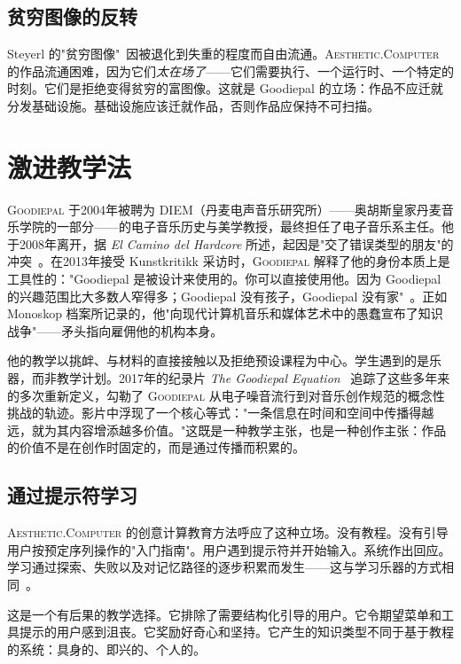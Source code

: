 \documentclass[10pt,letterpaper,twocolumn]{article}
\newcommand{\ac}{\textsc{Aesthetic.Computer}}
\newcommand{\gp}{\textsc{Goodiepal}}
\begin{document}
\subsection{贫穷图像的反转}

Steyerl 的"贫穷图像"~\citep{steyerl2009defense}因被退化到失重的程度而自由流通。\ac{} 的作品流通困难，因为它们\emph{太在场了}——它们需要执行、一个运行时、一个特定的时刻。它们是拒绝变得贫穷的富图像。这就是 Goodiepal 的立场：作品不应迁就分发基础设施。基础设施应该迁就作品，否则作品应保持不可扫描。

\section{激进教学法}

\gp{} 于2004年被聘为 DIEM（丹麦电声音乐研究所）——奥胡斯皇家丹麦音乐学院的一部分——的电子音乐历史与美学教授，最终担任了电子音乐系主任。他于2008年离开，据 \emph{El Camino del Hardcore} 所述，起因是"交了错误类型的朋友"的冲突~\citep{goodiepal2012elcamino}。在2013年接受 Kunstkritikk 采访时，\gp{} 解释了他的身份本质上是工具性的："Goodiepal 是被设计来使用的。你可以直接使用他。因为 Goodiepal 的兴趣范围比大多数人窄得多；Goodiepal 没有孩子，Goodiepal 没有家"~\citep{kunstkritikk2013goodiepal}。正如 Monoskop 档案所记录的，他"向现代计算机音乐和媒体艺术中的愚蠢宣布了知识战争"——矛头指向雇佣他的机构本身。

他的教学以挑衅、与材料的直接接触以及拒绝预设课程为中心。学生遇到的是乐器，而非教学计划。2017年的纪录片 \emph{The Goodiepal Equation}~\citep{sanpakkila2017equation} 追踪了这些多年来的多次重新定义，勾勒了 \gp{} 从电子噪音流行到对音乐创作规范的概念性挑战的轨迹。影片中浮现了一个核心等式："一条信息在时间和空间中传播得越远，就为其内容增添越多价值。"这既是一种教学主张，也是一种创作主张：作品的价值不是在创作时固定的，而是通过传播而积累的。

\subsection{通过提示符学习}

\ac{} 的创意计算教育方法呼应了这种立场。没有教程。没有引导用户按预定序列操作的"入门指南"。用户遇到提示符并开始输入。系统作出回应。学习通过探索、失败以及对记忆路径的逐步积累而发生——这与学习乐器的方式相同~\citep{papert1980mindstorms}。

这是一个有后果的教学选择。它排除了需要结构化引导的用户。它令期望菜单和工具提示的用户感到沮丧。它奖励好奇心和坚持。它产生的知识类型不同于基于教程的系统：具身的、即兴的、个人的。
\end{document}
